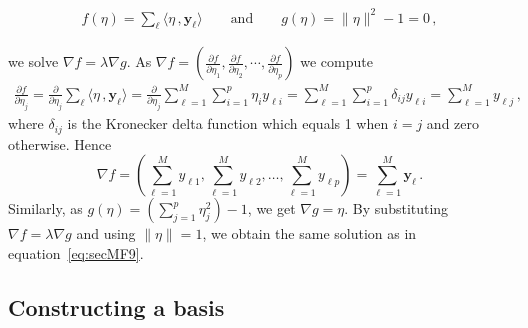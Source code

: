\documentclass[letter,12pt]{article}
\begin{document}
\begin{align}\label{eq:secMF6}
	f(\eta)  = \sum_{\ell}\langle \eta\, , \bm{y}_{\ell} \rangle \qquad \text{and} \qquad
	g(\eta) =  \lVert\eta\rVert^2 - 1 = 0 \, ,
\end{align}

we solve $\nabla f = \lambda \nabla g$.  As $\nabla f = \left( \frac{\partial f}{\partial \eta_1}, \frac{\partial f}{\partial \eta_2}, \cdots, \frac{\partial f}{\partial \eta_p} \right)$ we compute
\begin{align}\label{eq:secMF7}
	\frac{\partial f}{\partial \eta_j}
     = \frac{\partial }{\partial \eta_j}\sum_{\ell}\langle \eta\, , \bm{y}_{\ell}\rangle
     = \frac{\partial }{\partial \eta_j} \sum_{\ell=1}^M \sum_{i=1}^p \eta_i y_{\ell i}
     = \sum_{\ell=1}^M \sum_{i=1}^p \delta_{ij} y_{\ell i}
     = \sum_{\ell=1}^M y_{\ell j} \, ,
\end{align}
where $\delta_{ij}$ is the Kronecker delta function which equals 1 when $i=j$ and zero otherwise. Hence
\begin{equation}\label{eq:secMF8}
	\nabla f = \left(\sum_{\ell=1}^M y_{\ell1}, \sum_{\ell=1}^M y_{\ell2}, \dots, \sum_{\ell=1}^M y_{\ell p} \right) = \sum_{\ell=1}^M \bm{y}_\ell \, .
\end{equation}
Similarly, as $g(\eta) = \left( \sum_{j=1}^p \eta_j^2\right) - 1$, we get $\nabla g = \eta$. By substituting $\nabla f = \lambda \nabla g$ and using $\lVert\eta\rVert = 1$, we obtain the same solution as in equation~\eqref{eq:secMF9}.

\subsection{Constructing a basis}\label{sec:MathFrame3}
\end{document}
